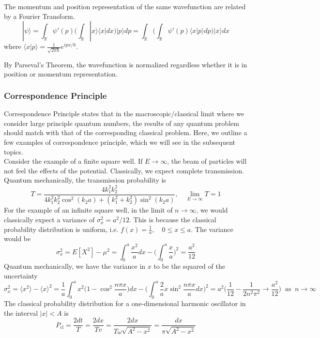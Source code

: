 \documentclass[a4paper]{article}
\begin{document}
\begin{thm}
The momentum and position representation of the same wavefunction are related by a Fourier Transform.
$$|\psi\rangle=\int_{\mathbb{R}}\psi'(p)\bigg(\int_{\mathbb{R}}|x\rangle\langle x|dx\bigg)|p\rangle dp=\int_{\mathbb{R}}\bigg(\int_{\mathbb{R}}\psi'(p)\langle x|p\rangle dp\bigg)|x\rangle dx$$
where $\langle x|p\rangle=\frac{1}{\sqrt{2\pi\hbar}}e^{ipx/\hbar}$.
\end{thm}
\begin{remarks}
By Parseval's Theorem, the wavefunction is normalized regardless whether it is in position or momentum representation.
\end{remarks}
\newpage
\subsubsection*{Correspondence Principle}
Correspondence Principle states that in the macroscopic/classical limit where we consider large principle quantum numbers, the results of any quantum problem should match with that of the corresponding classical problem. Here, we outline a few examples of correspondence principle, which we will see in the subsequent topics.\\[5pt]
Consider the example of a finite square well. If $E\rightarrow\infty$, the beam of particles will not feel the effects of the potential. Classically, we expect complete transmission. Quantum mechanically, the transmission probability is
$$T=\frac{4k_1^2k_2^2}{4k_1^2k_2^2\cos^2(k_2a)+(k_1^2+k_2^2)\sin^2(k_2a)},\quad\lim_{E\rightarrow\infty}T=1$$
For the example of an infinite square well, in the limit of $n\rightarrow\infty$, we would classically expect a variance of $\sigma_x^2=a^2/12$. This is because the classical probability distribution is uniform, i.e. $f(x)=\frac{1}{a},\quad 0\leq x\leq a$. The variance would be
$$\sigma_x^2=E[X^2]-\mu^2=\int_0^a\frac{x^2}{a}dx-\bigg(\int_0^a\frac{x}{a}\bigg)^2=\frac{a^2}{12}$$
Quantum mechanically, we have the variance in $x$ to be the squared of the uncertainty
$$\sigma_x^2=\langle x^2\rangle-\langle x\rangle^2=\frac{1}{a}\int_0^ax^2\bigg(1-\cos^2\frac{n\pi x}{a}\bigg)dx-\bigg(\int_0^a\frac{2}{a}x\sin^2\frac{n\pi x}{a}dx\bigg)^2=a^2\bigg(\frac{1}{12}-\frac{1}{2n^2\pi^2}\rightarrow\frac{a^2}{12}\bigg)~\text{ as }~n\rightarrow\infty$$
The classical probability distribution for a one-dimensional harmonic oscillator in the interval $|x|<A$ is
$$P_{\text{cl}}=\frac{2dt}{T}=\frac{2dx}{Tv}=\frac{2dx}{T\omega\sqrt{A^2-x^2}}=\frac{dx}{\pi\sqrt{A^2-x^2}}$$
\end{document}
